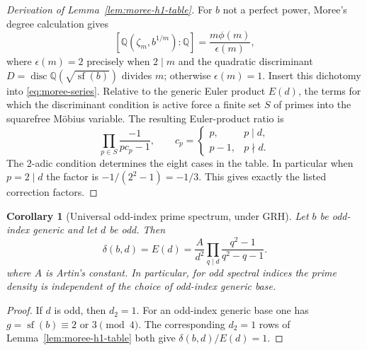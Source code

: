 \documentclass[11pt]{article}
\newtheorem{corollary}[theorem]{Corollary}
\begin{document}
\begin{proof}[Derivation of Lemma~\ref{lem:moree-h1-table}]
For $b$ not a perfect power, Moree's degree calculation gives
\[
[\mathbb Q(\zeta_m,b^{1/m}):\mathbb Q]
=\frac{m\phi(m)}{\epsilon(m)},
\]
where $\epsilon(m)=2$ precisely when $2\mid m$ and the quadratic discriminant
$D=\operatorname{disc}\mathbb Q(\sqrt{\operatorname{sf}(b)})$ divides $m$;
otherwise $\epsilon(m)=1$.  Insert this dichotomy into
\eqref{eq:moree-series}.  Relative to the generic Euler product $E(d)$, the
terms for which the discriminant condition is active force a finite set $S$
of primes into the squarefree Möbius variable.  The resulting Euler-product
ratio is
\[
\prod_{p\in S}\frac{-1}{p c_p-1},
\qquad
c_p=\begin{cases}
p,&p\mid d,\\ p-1,&p\nmid d.\end{cases}
\]
The $2$-adic condition determines the eight cases in the table.  In particular
when $p=2\mid d$ the factor is $-1/(2^2-1)=-1/3$.  This gives exactly the
listed correction factors.
\end{proof}

\begin{corollary}[Universal odd-index prime spectrum, under GRH]
\label{cor:odd-universal}
Let $b$ be odd-index generic and let $d$ be odd.  Then
\[
\delta(b,d)=E(d)
=
\frac{A}{d^2}
\prod_{q\mid d}
\frac{q^2-1}{q^2-q-1}.
\tag{A2}\label{eq:Em}
\]
where $A$ is Artin's constant.  In particular, for odd spectral indices the
prime density is independent of the choice of odd-index generic base.
\end{corollary}

\begin{proof}
If $d$ is odd, then $d_2=1$.  For an odd-index generic base one has
$g=\operatorname{sf}(b)\equiv2$ or $3\pmod4$.  The corresponding $d_2=1$
rows of Lemma~\ref{lem:moree-h1-table} both give
$\delta(b,d)/E(d)=1$.
\end{proof}
\end{document}
